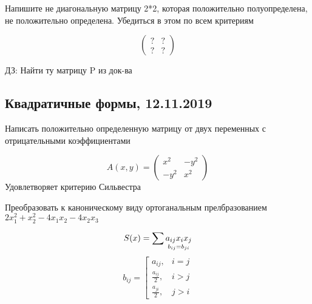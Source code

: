 \documentclass[12pt, fleqn]{article}
\begin{document}
\begin{task}
  Напишите не диагональную матрицу 2*2, которая положительно полуопределена, не положительно определена. Убедиться в этом по всем критериям
\end{task}

\begin{Sol}
  \[\begin{pmatrix}
    ? & ?\\
    ? & ?
  \end{pmatrix}\]
\end{Sol}

ДЗ: Найти ту матрицу P из док-ва

\subsection{Квадратичные формы, 12.11.2019}

\begin{task}
  Написать положительно определенную матрицу от двух переменных с отрицательными коэффициентами
\end{task}

\begin{Sol}
  \[A(x,y)=\begin{pmatrix}
    x^2 & -y^2\\
    -y^2 & x^2
  \end{pmatrix}\]
  Удовлетворяет критерию Сильвестра
\end{Sol}

\begin{task}
  Преобразовать к каноническому виду ортоганальным прелбразованием $2x_1^2 + x_2^2 - 4x_1 x_2 - 4x_2 x_3$
\end{task}

\begin{Reminder}
  \[S(x) = \sum \underset{b_{ij} = b_{ji}}{a_{ij} x_i x_j}\]
  \[b_{ij} = \left[\begin{matrix}
    a_{ij}, & i=j\\
    \frac{a_{ij}}{2}, & i > j\\
    \frac{a_{ji}}{2}, & j>i
  \end{matrix}\right.\]
\end{Reminder}
\end{document}
